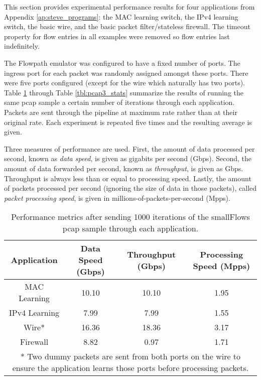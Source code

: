This section provides experimental performance results for four applications from Appendix \ref{ap:steve_programs}: the MAC learning switch, the IPv4 learning switch, the basic wire, and the basic packet filter/stateless firewall. The timeout property for flow entries in all examples were removed so flow entries last indefinitely.

The Flowpath emulator was configured to have a fixed number of ports. The ingress port for each packet was randomly assigned amongst these ports. There were five ports configured (except for the wire which naturally has two ports). Table \ref{tbl:pcap1_stats} through Table \ref{tbl:pcap3_stats} summarize the results of running the same pcap sample a certain number of iterations through each application. Packets are sent through the pipeline at maximum rate rather than at their original rate. Each experiment is repeated five times and the resulting average is given.

Three measures of performance are used. First, the amount of data processed per second, known as \textit{data speed}, is given as gigabits per second (Gbps). Second, the amount of data forwarded per second, known as \textit{throughput}, is given as Gbps. Throughput is always less than or equal to processing speed. Lastly, the amount of packets processed per second (ignoring the size of data in those packets), called \textit{packet processing speed}, is given in millions-of-packets-per-second (Mpps).

\begin{table}
\caption{Performance metrics after sending 1000 iterations of the smallFlows pcap sample through each application.}
\begin{center}
\begin{tabularx}{\textwidth}{| c || c | c | c | }
\hline
Application & Data Speed (Gbps) & Throughput (Gbps) & Processing Speed (Mpps)  \\
\hline
MAC Learning & 10.10 & 10.10 & 1.95  \\
\hline
IPv4 Learning & 7.99 & 7.99 & 1.55  \\
\hline 
Wire* & 16.36 & 18.36 & 3.17 \\
\hline
Firewall & 8.82 & 0.97 & 1.71 \\
\hline
\multicolumn{4}{p{\linewidth}}{* Two dummy packets are sent from both ports on the wire to ensure the application learns those ports before processing packets.}
\end{tabularx}
\end{center}
\label{tbl:pcap1_stats}
\end{table}


